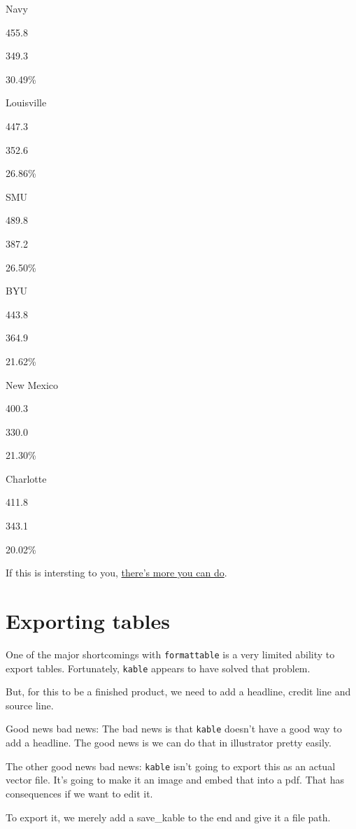 \documentclass[
]{book}
\begin{document}
Navy

455.8

349.3

{30.49\%}

Louisville

447.3

352.6

{26.86\%}

SMU

489.8

387.2

{26.50\%}

BYU

443.8

364.9

{21.62\%}

New Mexico

400.3

330.0

{21.30\%}

Charlotte

411.8

343.1

{20.02\%}

If this is intersting to you, \href{https://cran.r-project.org/web/packages/kableExtra/vignettes/awesome_table_in_html.html\#overview}{there's more you can do}.

\hypertarget{exporting-tables}{%
\section{Exporting tables}\label{exporting-tables}}

One of the major shortcomings with \texttt{formattable} is a very limited ability to export tables. Fortunately, \texttt{kable} appears to have solved that problem.

But, for this to be a finished product, we need to add a headline, credit line and source line.

Good news bad news: The bad news is that \texttt{kable} doesn't have a good way to add a headline. The good news is we can do that in illustrator pretty easily.

The other good news bad news: \texttt{kable} isn't going to export this as an actual vector file. It's going to make it an image and embed that into a pdf. That has consequences if we want to edit it.

To export it, we merely add a save\_kable to the end and give it a file path.
\end{document}
